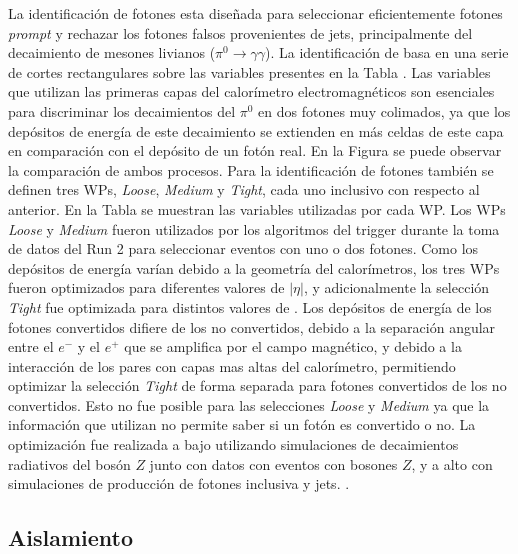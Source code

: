 La identificación de fotones esta diseñada para seleccionar eficientemente fotones \textit{prompt} y rechazar los fotones falsos provenientes de jets, principalmente del decaimiento de mesones livianos ($\pi^{0}\to\gamma\gamma$). La identificación de basa en una serie de cortes rectangulares sobre las variables presentes en la Tabla . Las variables que utilizan las primeras capas del calorímetro electromagnéticos son esenciales para discriminar los decaimientos del $\pi^{0}$ en dos fotones muy colimados, ya que los depósitos de energía de este decaimiento se extienden en más celdas de este capa en comparación con el depósito de un fotón real. En la Figura  se puede observar la comparación de ambos procesos. 
Para la identificación de fotones también se definen tres WPs, \textit{Loose}, \textit{Medium} y \textit{Tight}, cada uno inclusivo con respecto al anterior. En la Tabla  se muestran las variables utilizadas por cada WP. Los WPs \textit{Loose} y \textit{Medium}  fueron utilizados por los algoritmos del trigger durante la toma de datos del Run 2 para seleccionar eventos con uno o dos fotones. Como los depósitos de energía varían debido a la geometría del calorímetros, los tres WPs fueron optimizados para diferentes valores de $|\eta|$, y adicionalmente la selección \textit{Tight} fue optimizada para distintos valores de \ET. Los depósitos de energía de los fotones convertidos difiere de los no convertidos, debido a la separación angular entre el $e^-$ y el $e^+$ que se amplifica por el campo magnético, y debido a la interacción de los pares con capas mas altas del calorímetro, permitiendo optimizar la selección \textit{Tight} de forma separada para fotones convertidos de los no convertidos. Esto no fue posible para las selecciones \textit{Loose} y \textit{Medium} ya que la información que utilizan no permite saber si un fotón es convertido o no. La optimización fue realizada a bajo \ET utilizando simulaciones de decaimientos radiativos del bosón $Z$ junto con datos con eventos con bosones $Z$, y a alto \ET con simulaciones de producción de fotones inclusiva y jets. .



\subsection{Aislamiento}


